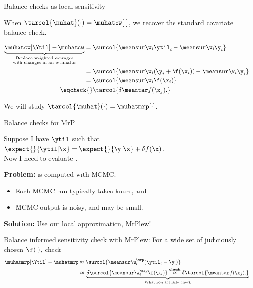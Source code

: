 
\begin{frame}[t]{Balance checks as local sensitivity}


When $\tarcol{\muhat}(\cdot) = \muhatcw[\cdot]$,
we recover the standard covariate balance check.

$$
\begin{aligned}
    \underbrace{
        \muhatcw[\Ytil] - \muhatcw
    }_{
        \substack{
            \text{Replace weighted averages} \\
            \text{with changes in an estimator}
        }
    }
    ={}&
    \surcol{\meansur \w_i \ytil_i - \meansur \w_i \y_i}
    \\={}&
    \surcol{\meansur \w_i (\y_i + \f(\x_i)) - \meansur \w_i \y_i}
    \\={}&
    \surcol{\meansur \w_i \f(\x_i)}
    \\\eqcheck{}&
    \tarcol{
    \delta \meantar f(\x_j).}
\end{aligned}
$$


We will study $\tarcol{\muhat}(\cdot) = \muhatmrp[\cdot]$.

\end{frame}



\begin{frame}[t]{Balance checks for MrP}

Suppose I have
$\ytil$ such that $\expect{}{\ytil \vert \x} = \expect{}{\y \vert \x} + \delta f(\x)$.\\
Now I need to evaluate \surcol{$\muhatmrp[\Ytil] - \muhatmrp$}.
\pause

\textbf{Problem:} \surcol{$\muhatmrp[\cdot]$} is computed with MCMC.
%
\begin{itemize}
\item Each MCMC run typically takes hours, and
\item MCMC output is noisy, and \surcol{$\muhatmrp[\Ytil] - \muhatmrp$} may be small.
\end{itemize}
%
\pause
\textbf{Solution:} Use our local approximation, MrPlew!

\begin{block}{Balance informed sensitivity check with MrPlew:}
For a wide set of judiciously chosen $\f(\cdot)$, check
$$
\begin{aligned}
\muhatmrp[\Ytil] - \muhatmrp \approx{}&
    \surcol{\meansur \w_i^\mrp (\ytil_i - \y_i)}
    \\\approx{}&
    \underbrace{
        \delta  \surcol{\meansur \w_i^\mrp \f(\x_i)}
            \overset{\textrm{\textbf{check}}}{\approx}
        \delta \tarcol{\meantar f(\x_j).}
    }_{\textrm{What you actually check}}
\end{aligned}
$$
\end{block}

\end{frame}

